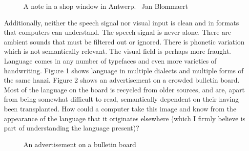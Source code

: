 \documentclass[man,12pt,natbib]{apa6}
\begin{document}
\begin{figure}
	\caption{A note in a shop window in Antwerp. \textcopyright~Jan Blommaert}
\end{figure}

Additionally, neither the speech signal nor visual input is clean and in
formats that computers can understand. The speech signal is never alone. There
are ambient sounds that must be filtered out or ignored. There is phonetic
variation which is not semantically relevant. The visual field is perhaps more
fraught. Language comes in any number of typefaces and even more varieties of
handwriting. Figure 1 shows language in multiple dialects and multiple forms of
the same hanzi. Figure 2 shows an advertisement on a crowded bulletin board.
Most of the language on the board is recycled from older sources, and are,
apart from being somewhat difficult to read, semantically dependent on their
having been transplanted. How could a computer take this image and know from
the appearance of the language that it originates elsewhere (which I firmly
believe is part of understanding the language present)?

\begin{figure}
	\caption{An advertisement on a bulletin board}
\end{figure}
\end{document}
